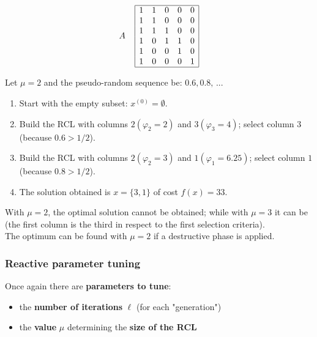 $$
A \;\;\;\;
\begin{array}{| c c c c c |}
	\hline
	1 & 1 & 0 & 0 & 0 \\
	1 & 1 & 0 & 0 & 0 \\
	1 & 1 & 1 & 0 & 0 \\
	1 & 0 & 1 & 1 & 0 \\
	1 & 0 & 0 & 1 & 0 \\
	1 & 0 & 0 & 0 & 1 \\
	\hline
\end{array}
$$

Let $\mu = 2$ and the pseudo-random sequence be: $0.6, 0.8, \, ...$
\begin{enumerate}
	\item Start with the empty subset: $x^{(0)} = \emptyset$.\\
	
	\item Build the RCL with columns $2 (\varphi_2 = 2)$ and $3 (\varphi_3 = 4)$; select column $3$ (because $0.6 > 1/2$).\\
	
	\item Build the RCL with columns $2 (\varphi_2 = 3)$ and $1 (\varphi_1 = 6.25)$; select column $1$ (because $0.8 > 1/2$).\\
	
	\item The solution obtained is $x = \{3, 1\}$ of cost $f (x) = 33$.\\
\end{enumerate}

With $\mu = 2$, the optimal solution cannot be obtained; while with $\mu = 3$ it can be (the first column is the third in respect to the first selection criteria).\\

The optimum can be found with $\mu = 2$ if a destructive phase is applied.\\

\newpage

\subsubsection{Reactive parameter tuning}

Once again there are \textbf{parameters to tune}:
\begin{itemize}
	\item the \textbf{number of iterations} $\ell$ (for each "generation")
	\item the \textbf{value} $\mu$ determining the \textbf{size of the RCL}
\end{itemize}

